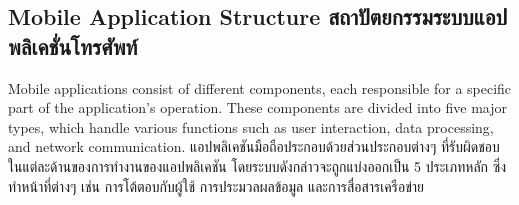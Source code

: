 \subsection{\ifenglish Mobile Application Structure \else สถาปัตยกรรมระบบแอปพลิเคชั่นโทรศัพท์ \fi}

\ifenglish
Mobile applications consist of different components, each responsible for a specific part of the application’s operation. These components are divided into five major types, which handle various functions such as user interaction, data processing, and network communication.
\else
แอปพลิเคชันมือถือประกอบด้วยส่วนประกอบต่างๆ ที่รับผิดชอบในแต่ละด้านของการทำงานของแอปพลิเคชัน โดยระบบดังกล่าวจะถูกแบ่งออกเป็น 5 ประเภทหลัก ซึ่งทำหน้าที่ต่างๆ เช่น การโต้ตอบกับผู้ใช้ การประมวลผลข้อมูล และการสื่อสารเครือข่าย
\fi

\ifenglish
